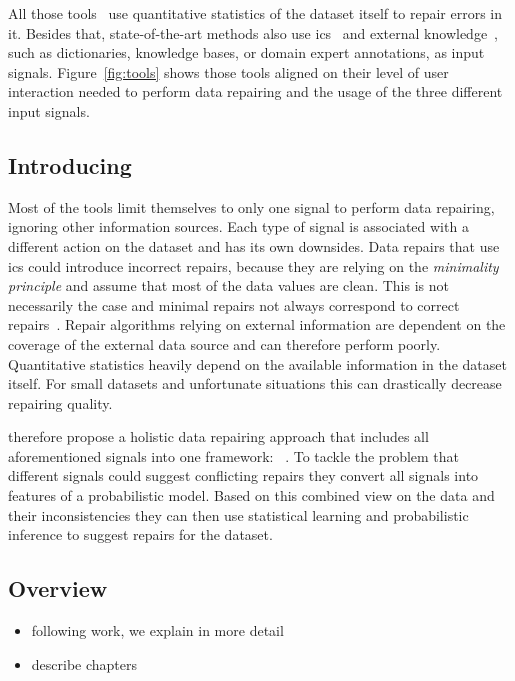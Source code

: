   All those tools~\cite{scare,potters_wheel,data_wrangler,trifacta_wrangler} use quantitative statistics of the dataset itself to repair errors in it.
  Besides that, state-of-the-art methods also use \glspl{ic}~\cite{ajax,gdr,editing_rules,data_tamer} and external knowledge~\cite{katara}, such as dictionaries, knowledge bases, or domain expert annotations, as input signals.
  Figure~\ref{fig:tools} shows those tools aligned on their level of user interaction needed to perform data repairing and the usage of the three different input signals.

  \begin{figure*}
    \centering
    
    \caption{Data Repairing Tools in Context}
    \label{fig:tools}
  \end{figure*}


  \subsection{Introducing \holoclean{}}
  Most of the tools limit themselves to only one signal to perform data repairing, ignoring other information sources.
  Each type of signal is associated with a different action on the dataset and has its own downsides.
  Data repairs that use \glspl{ic} could introduce incorrect repairs, because they are relying on the \textit{minimality principle} and assume that most of the data values are clean.
  This is not necessarily the case and minimal repairs not always correspond to correct repairs~\cite{holoclean}.
  Repair algorithms relying on external information are dependent on the coverage of the external data source and can therefore perform poorly.
  Quantitative statistics heavily depend on the available information in the dataset itself.
  For small datasets and unfortunate situations this can drastically decrease repairing quality.
  
  \citeauthor{holoclean} therefore propose a holistic data repairing approach that includes all aforementioned signals into one framework: \holoclean{}~\cite{holoclean}.
  To tackle the problem that different signals could suggest conflicting repairs they convert all signals into features of a probabilistic model.
  Based on this combined view on the data and their inconsistencies they can then use statistical learning and probabilistic inference to suggest repairs for the dataset.
  
  \subsection{Overview}
  \begin{itemize}
    \item following work, we explain \holoclean{} in more detail
    \item describe chapters
  \end{itemize}


